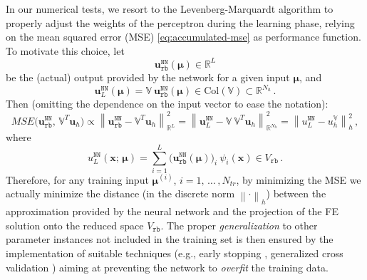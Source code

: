 \documentclass{elsarticle}
\numberwithin{equation}{section}
\theoremstyle{theorem}
\theoremstyle{definition}
\theoremstyle{remark}
\theoremstyle{proposition}
\numberwithin{figure}{section}
\newcommand{\norm}[1]{\left\lVert#1\right\rVert}
\newcommand{\bg}[1]{\boldsymbol{#1}}
\begin{document}
		In our numerical tests, we resort to the Levenberg-Marquardt algorithm to properly adjust the weights of the perceptron during the learning phase, relying on the mean squared error (MSE) \eqref{eq:accumulated-mse} as performance function. To motivate this choice, let 
		\begin{equation*}
			\mathbf{u}_{\texttt{rb}}^{\texttt{NN}}(\bg{\mu}) \in \mathbb{R}^L
		\end{equation*}
		be the (actual) output provided by the network for a given input $\bg{\mu}$, and 
		\begin{equation*}
			\mathbf{u}_L^{\texttt{NN}}(\bg{\mu}) = \mathbb{V} ~ \mathbf{u}_{\texttt{rb}}^{\texttt{NN}}(\bg{\mu}) \in \text{Col}(\mathbb{V}) \subset \mathbb{R}^{N_h} \, . 
		\end{equation*}
		Then (omitting the dependence on the input vector to ease the notation):
		\begin{equation*}
			\label{eq:pod-nn-mse}
				MSE \big( \mathbf{u}_{\texttt{rb}}^{\texttt{NN}}, \, \mathbb{V}^T \mathbf{u}_h \big) \propto \norm{\mathbf{u}_{\texttt{rb}}^{\texttt{NN}} - \mathbb{V}^T \mathbf{u}_h}^2_{\mathbb{R}^L} = \norm{\mathbf{u}_L^{\texttt{NN}} - \mathbb{V} ~ \mathbb{V}^T \mathbf{u}_h}^2_{\mathbb{R}^{N_h}} = \norm{u_L^{\texttt{NN}} - u_h^{\mathbb{V}}}^2_h \, ,
		\end{equation*} 
		where
		\begin{equation*}
			\label{eq:pod-nn-solution}
			u_L^{\texttt{NN}}(\bg{x}; \, \bg{\mu}) = \sum_{i = 1}^L \big( \mathbf{u}_{\texttt{rb}}^{\texttt{NN}}(\bg{\mu}) \big)_i ~ \psi_i(\bg{x}) \in V_{\texttt{rb}} \, .
		\end{equation*}
		Therefore, for any training input $\bg{\mu}^{(i)}$, $i = 1, \, \ldots \, , N_{tr}$, by minimizing the MSE we actually minimize the distance (in the discrete norm $\norm{\cdot}_h$) between the approximation provided by the neural network and the projection of the FE solution onto the reduced space $V_{\texttt{rb}}$. The proper \emph{generalization} to other parameter instances not included in the training set is then ensured by the implementation of suitable techniques (e.g., early stopping \cite{Mat16}, generalized cross validation \cite{Koh95}) aiming at preventing the network to \emph{overfit} the training data.
		
		
\end{document}
